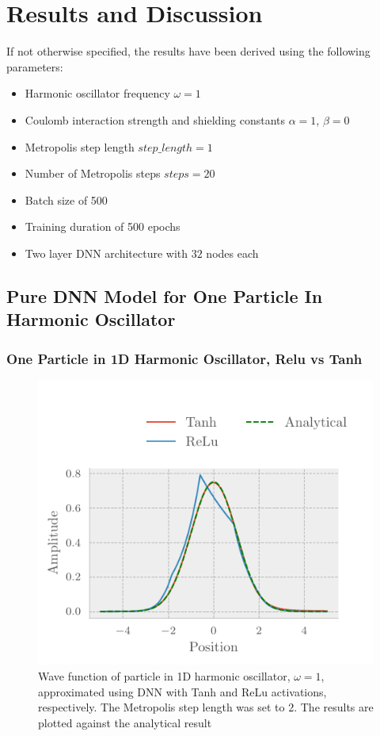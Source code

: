 \section{Results and Discussion}\label{sec:Discussion}

If not otherwise specified, the results have been derived using the following parameters:
\begin{itemize}
	\item Harmonic oscillator frequency $\omega = 1$
	\item Coulomb interaction strength and shielding constants $\alpha = 1$, $\beta = 0$
	\item Metropolis step length $step\_length = 1$
	\item Number of Metropolis steps $steps = 20$
	\item Batch size of 500
	\item Training duration of 500 epochs
	\item Two layer DNN architecture with $32$ nodes each  
\end{itemize}


\subsection{Pure DNN Model for One Particle In Harmonic Oscillator}
\subsubsection{One Particle in 1D Harmonic Oscillator, Relu vs Tanh}

\begin{figure}[H]
	\includegraphics[]{figures/one_part_wavefunc.pdf}
	\caption{Wave function of particle in 1D harmonic oscillator, $\omega=1$, approximated using DNN with Tanh and ReLu activations, respectively. The Metropolis step length was set to $2$. The results are plotted against the analytical result}
	\label{fig:one_part_func}
\end{figure}

